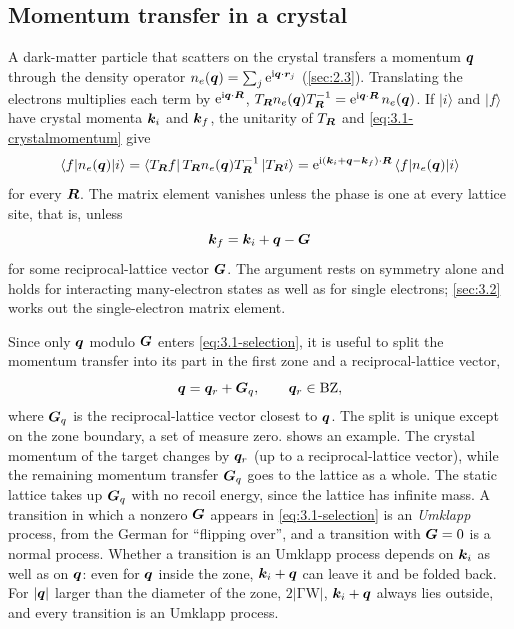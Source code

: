 \subsection{Momentum transfer in a crystal}

A dark-matter particle that scatters on the crystal transfers a momentum $\bm{q}$ through the density operator $n_e(\bm{q}) = \sum_j\mathrm{e}^{\mathrm{i}\bm{q}\cdot\bm{r}_j}$ (\cref{sec:2.3}). Translating the electrons multiplies each term by $\mathrm{e}^{\mathrm{i}\bm{q}\cdot\bm{R}}$, $T_{\bm{R}}n_e(\bm{q})T_{\bm{R}}^{-1} = \mathrm{e}^{\mathrm{i}\bm{q}\cdot\bm{R}}\,n_e(\bm{q})$. If $|i\rangle$ and $|f\rangle$ have crystal momenta $\bm{k}_i$ and $\bm{k}_f$, the unitarity of $T_{\bm{R}}$ and \cref{eq:3.1-crystalmomentum} give
\begin{equation*}
  \langle f|n_e(\bm{q})|i\rangle = \langle T_{\bm{R}}f|\,T_{\bm{R}}n_e(\bm{q})T_{\bm{R}}^{-1}\,|T_{\bm{R}}i\rangle = \mathrm{e}^{\mathrm{i}(\bm{k}_i + \bm{q} - \bm{k}_f)\cdot\bm{R}}\,\langle f|n_e(\bm{q})|i\rangle
\end{equation*}
for every $\bm{R}$. The matrix element vanishes unless the phase is one at every lattice site, that is, unless
\begin{equation}
  \bm{k}_f = \bm{k}_i + \bm{q} - \bm{G}
  \label{eq:3.1-selection}
\end{equation}
for some reciprocal-lattice vector $\bm{G}$. The argument rests on symmetry alone and holds for interacting many-electron states as well as for single electrons; \cref{sec:3.2} works out the single-electron matrix element.

Since only $\bm{q}$ modulo $\bm{G}$ enters \cref{eq:3.1-selection}, it is useful to split the momentum transfer into its part in the first zone and a reciprocal-lattice vector,
\begin{equation}
  \bm{q} = \bm{q}_r + \bm{G}_q, \qquad \bm{q}_r \in \mathrm{BZ},
  \label{eq:3.1-qsplit}
\end{equation}
where $\bm{G}_q$ is the reciprocal-lattice vector closest to $\bm{q}$. The split is unique except on the zone boundary, a set of measure zero.  shows an example. The crystal momentum of the target changes by $\bm{q}_r$ (up to a reciprocal-lattice vector), while the remaining momentum transfer $\bm{G}_q$ goes to the lattice as a whole. The static lattice takes up $\bm{G}_q$ with no recoil energy, since the lattice has infinite mass. A transition in which a nonzero $\bm{G}$ appears in \cref{eq:3.1-selection} is an \emph{Umklapp} process, from the German for ``flipping over'', and a transition with $\bm{G} = 0$ is a normal process. Whether a transition is an Umklapp process depends on $\bm{k}_i$ as well as on $\bm{q}$: even for $\bm{q}$ inside the zone, $\bm{k}_i + \bm{q}$ can leave it and be folded back. For $|\bm{q}|$ larger than the diameter of the zone, $2|\mathrm{\Gamma W}|$, $\bm{k}_i + \bm{q}$ always lies outside, and every transition is an Umklapp process.

